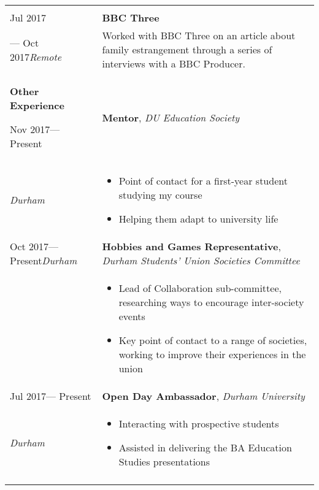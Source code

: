 \documentclass[12pt, a4paper]{article}
\newcommand{\smitem}[1]{\item {\small {#1}}}
\newenvironment{bullets}{\begin{minipage}[t]{\linewidth}\begin{itemize}[leftmargin=2em,label=-,nosep]}{\end{itemize}\end{minipage}\vspace{5pt}}
\newenvironment{sectionitem}{\vspace{6pt}\noindent\tabularx{\linewidth}{p{70pt}X}}{\endtabularx}
\newcommand{\sectionheader}[1]{
	\vspace{6pt}
	{
		\noindent
		\Large\textbf{#1}}}
\begin{document}
	\noindent
	\begin{tabularx}{\textwidth}{X|X}
	
		\begin{minipage}[t]{\linewidth}
			\sectionheader{Experience Regarding Estrangement (Cont.)}\\
			\begin{sectionitem}
				Jul 2017&\textbf{BBC Three}\\
				--- Oct 2017\newline\emph{Remote}&Worked with BBC Three on an article about family estrangement through a series of interviews with a BBC Producer.\\
			\end{sectionitem}
		
			\sectionheader{Other Experience}
			
			\begin{sectionitem}
				Nov 2017\newline--- Present&\textbf{Mentor}, \emph{DU Education Society}\\
				\emph{Durham}&\begin{bullets}
					\smitem{Point of contact for a first-year student studying my course}
					\smitem{Helping them adapt to university life}
				\end{bullets}\\
			\end{sectionitem}
		
			\begin{sectionitem}
				Oct 2017\newline --- Present\newline\emph{Durham}&\textbf{Hobbies and Games Representative}, \emph{Durham Students' Union Societies Committee}\\
				&\begin{bullets}
					\smitem{Lead of Collaboration sub-committee, researching ways to encourage inter-society events}
					\smitem{Key point of contact to a range of societies, working to improve their experiences in the union}
				\end{bullets}\\
			\end{sectionitem}
		
			\begin{sectionitem}
				Jul 2017\newline --- Present&\textbf{Open Day Ambassador}, \emph{Durham University}\\
				\emph{Durham}&\begin{bullets}
					\smitem{Interacting with prospective students}
					\smitem{Assisted in delivering the BA Education Studies presentations}
				\end{bullets}\\
			\end{sectionitem}
		

\end{minipage}
\end{tabularx}
\end{document}
